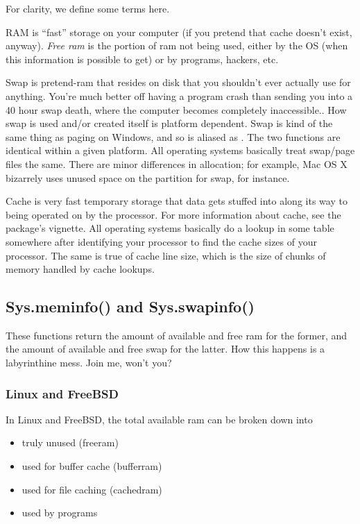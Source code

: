 For clarity, we define some terms here.

RAM is ``fast'' storage on your computer (if you pretend that cache doesn't 
exist, anyway).  \emph{Free ram} is the portion of ram not being used, either 
by the OS (when this information is possible to get) or by programs, hackers, 
etc.

Swap is pretend-ram that resides on disk that you shouldn't ever actually use for anything.  
You're much better off having a program crash than sending you into a 40 hour swap death, where 
the computer becomes completely inaccessible..  How swap is used and/or created itself is 
platform dependent.  Swap is kind of the same thing as paging on 
Windows, and so  is aliased as .  The 
two functions are identical within a given platform.  All operating systems basically treat 
swap/page files the same.  There are minor differences in allocation; for example, Mac OS X 
bizarrely uses unused space on the  partition for swap, for instance.

Cache is very fast temporary storage that data gets stuffed into along its way to being operated on 
by the processor.  For more information about cache, see the  package's vignette.  All 
operating systems basically do a lookup in some table somewhere after identifying your processor to 
find the cache sizes of your processor.  The same is true of cache line size, which is the size of 
chunks of memory handled by cache lookups.



\subsection{Sys.meminfo() and Sys.swapinfo()}

These functions return the amount of available and free ram for the former, and the amount of 
available and free swap for the latter.  How this happens is a labyrinthine mess.  Join me, won't 
you?


\subsubsection{Linux and FreeBSD}
In Linux and FreeBSD, the total available ram can be broken down into
\begin{itemize}
  \item truly unused (freeram)
  \item used for buffer cache (bufferram)
  \item used for file caching (cachedram)
  \item used by programs
\end{itemize}

